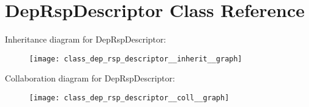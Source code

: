 \hypertarget{class_dep_rsp_descriptor}{}\section{Dep\+Rsp\+Descriptor Class Reference}
\label{class_dep_rsp_descriptor}


Inheritance diagram for Dep\+Rsp\+Descriptor\+:
\nopagebreak
\begin{figure}[H]
\begin{center}
\leavevmode
\texttt{[image: class\_dep\_rsp\_descriptor\_\_inherit\_\_graph]}
\end{center}
\end{figure}


Collaboration diagram for Dep\+Rsp\+Descriptor\+:
\nopagebreak
\begin{figure}[H]
\begin{center}
\leavevmode
\texttt{[image: class\_dep\_rsp\_descriptor\_\_coll\_\_graph]}
\end{center}
\end{figure}
